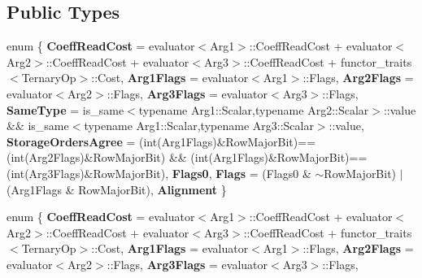 \subsection*{Public Types}
\begin{DoxyCompactItemize}
\item 
\mbox{\label{struct_eigen_1_1internal_1_1ternary__evaluator_3_01_cwise_ternary_op_3_01_ternary_op_00_01_arg1_daf42d21bcfee99cfa54e03ffa9506fc_a07d11a23dd63ec7bb1575d5c74747c14}} 
enum \{ \newline
{\bfseries Coeff\+Read\+Cost} = evaluator$<$Arg1$>$\+:\+:Coeff\+Read\+Cost + evaluator$<$Arg2$>$\+:\+:Coeff\+Read\+Cost + evaluator$<$Arg3$>$\+:\+:Coeff\+Read\+Cost + functor\+\_\+traits$<$Ternary\+Op$>$\+:\+:Cost, 
{\bfseries Arg1\+Flags} = evaluator$<$Arg1$>$\+:\+:Flags, 
{\bfseries Arg2\+Flags} = evaluator$<$Arg2$>$\+:\+:Flags, 
{\bfseries Arg3\+Flags} = evaluator$<$Arg3$>$\+:\+:Flags, 
\newline
{\bfseries Same\+Type} = is\+\_\+same$<$typename Arg1\+:\+:Scalar,typename Arg2\+:\+:Scalar$>$\+:\+:value \&\& is\+\_\+same$<$typename Arg1\+:\+:Scalar,typename Arg3\+:\+:Scalar$>$\+:\+:value, 
{\bfseries Storage\+Orders\+Agree} = (int(Arg1\+Flags)\&Row\+Major\+Bit)==(int(Arg2\+Flags)\&Row\+Major\+Bit) \&\& (int(Arg1\+Flags)\&Row\+Major\+Bit)==(int(Arg3\+Flags)\&Row\+Major\+Bit), 
{\bfseries Flags0}, 
{\bfseries Flags} = (Flags0 \& $\sim$\+Row\+Major\+Bit) $\vert$ (Arg1\+Flags \& Row\+Major\+Bit), 
\newline
{\bfseries Alignment}
 \}
\item 
\mbox{\label{struct_eigen_1_1internal_1_1ternary__evaluator_3_01_cwise_ternary_op_3_01_ternary_op_00_01_arg1_daf42d21bcfee99cfa54e03ffa9506fc_af496d7f36133c8486b2eab48732b43ce}} 
enum \{ \newline
{\bfseries Coeff\+Read\+Cost} = evaluator$<$Arg1$>$\+:\+:Coeff\+Read\+Cost + evaluator$<$Arg2$>$\+:\+:Coeff\+Read\+Cost + evaluator$<$Arg3$>$\+:\+:Coeff\+Read\+Cost + functor\+\_\+traits$<$Ternary\+Op$>$\+:\+:Cost, 
{\bfseries Arg1\+Flags} = evaluator$<$Arg1$>$\+:\+:Flags, 
{\bfseries Arg2\+Flags} = evaluator$<$Arg2$>$\+:\+:Flags, 
{\bfseries Arg3\+Flags} = evaluator$<$Arg3$>$\+:\+:Flags, 
\newline

\end{DoxyCompactItemize}
